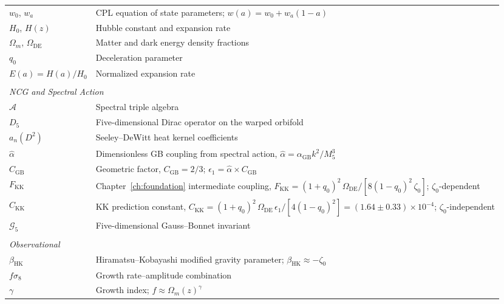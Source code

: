 \documentclass[10pt,a4paper,openany,twocolumn]{book}
\theoremstyle{definition}
\theoremstyle{remark}
\begin{document}
\begin{longtable}{l p{10cm}}
$w_0$, $w_a$ & CPL equation of state parameters; $w(a) = w_0 + w_a(1-a)$ \\
$H_0$, $H(z)$ & Hubble constant and expansion rate \\
$\Omega_m$, $\Omega_{\mathrm{DE}}$ & Matter and dark energy density fractions \\
$q_0$ & Deceleration parameter \\
$E(a) = H(a)/H_0$ & Normalized expansion rate \\
\\
\multicolumn{2}{l}{\textit{NCG and Spectral Action}} \\
$\mathcal{A}$ & Spectral triple algebra \\
$D_5$ & Five-dimensional Dirac operator on the warped orbifold \\
$a_n(D^2)$ & Seeley--DeWitt heat kernel coefficients \\
$\hat{\alpha}$ & Dimensionless GB coupling from spectral action, $\hat{\alpha} = \alpha_{\mathrm{GB}} k^2/M_5^3$ \\
$C_{\mathrm{GB}}$ & Geometric factor, $C_{\mathrm{GB}} = 2/3$; $\epsilon_1 = \hat{\alpha} \times C_{\mathrm{GB}}$ \\
$F_{\mathrm{KK}}$ & Chapter~\ref{ch:foundation} intermediate coupling, $F_{\mathrm{KK}} = (1{+}q_0)^2\,\Omega_{\mathrm{DE}}/[8(1{-}q_0)^2\,\zeta_0]$; $\zeta_0$-dependent \\
$C_{\mathrm{KK}}$ & KK prediction constant, $C_{\mathrm{KK}} = (1{+}q_0)^2\,\Omega_{\mathrm{DE}}\,\epsilon_1/[4(1{-}q_0)^2] = (1.64 \pm 0.33) \times 10^{-4}$; $\zeta_0$-independent \\
$\mathcal{G}_5$ & Five-dimensional Gauss--Bonnet invariant \\
\\
\multicolumn{2}{l}{\textit{Observational}} \\
$\beta_{\mathrm{HK}}$ & Hiramatsu--Kobayashi modified gravity parameter; $\beta_{\mathrm{HK}} \approx -\zeta_0$ \\
$f\sigma_8$ & Growth rate--amplitude combination \\
$\gamma$ & Growth index; $f \approx \Omega_m(z)^\gamma$ \\
\end{longtable}

\twocolumn  %
\mainmatter




\end{document}
